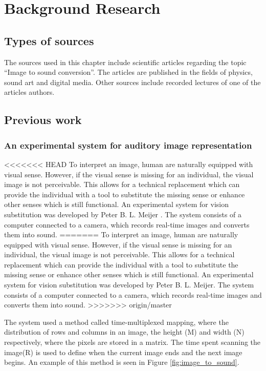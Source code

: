 \chapter{Background Research}\label{ch:bgresearch}



\section{Types of sources}\label{sec:typesofsources} 
The sources used in this chapter include scientific articles regarding the topic “Image to sound conversion”. The articles are published in the fields of physics, sound art and digital media. Other sources include recorded lectures of one of the articles authors.

\section{Previous work}\label{sec:previouswork}

\subsection{An experimental system for auditory image representation}\label{sec:experimentalsystem}

<<<<<<< HEAD
To interpret an image, human are naturally equipped with visual sense. However, if the visual sense is missing for an individual, the visual image is not perceivable. This allows for a technical replacement which can provide the individual with a tool to substitute the missing sense or enhance other senses which is still functional. An experimental system for vision substitution was developed by Peter B. L. Meijer \cite{Meijer1992}. The system consists of a computer connected to a camera, which records real-time images and converts them into sound. 
=======
To interpret an image, human are naturally equipped with visual sense. However, if the visual sense is missing for an individual, the visual image is not perceivable. This allows for a technical replacement which can provide the individual with a tool to substitute the missing sense or enhance other senses which is still functional. An experimental system for vision substitution was developed by Peter B. L. Meijer\cite{Meijer1992}. The system consists of a computer connected to a camera, which records real-time images and converts them into sound. 
>>>>>>> origin/master

The system used a method called time-multiplexed mapping, where the distribution of rows and columns in an image, the height (M) and width (N) respectively, where the pixels are stored in a matrix. The time spent scanning the image(R) is used to define when the current image ends and the next image begins. An example of this method is seen in Figure \ref{fig:image_to_sound}. 


